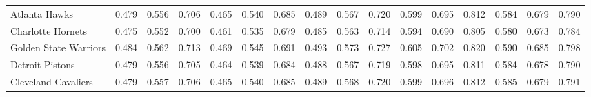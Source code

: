 \documentclass[11pt,a4paper]{article}
\begin{document}
\begin{table}[H]
\begin{tabular}{l ccc ccc ccc ccc ccc}
Atlanta Hawks & 0.479 & 0.556 & 0.706 & 0.465 & 0.540 & 0.685 & 0.489 & 0.567 & 0.720 & 0.599 & 0.695 & 0.812 & 0.584 & 0.679 & 0.790 \\
Charlotte Hornets & 0.475 & 0.552 & 0.700 & 0.461 & 0.535 & 0.679 & 0.485 & 0.563 & 0.714 & 0.594 & 0.690 & 0.805 & 0.580 & 0.673 & 0.784 \\
Golden State Warriors & 0.484 & 0.562 & 0.713 & 0.469 & 0.545 & 0.691 & 0.493 & 0.573 & 0.727 & 0.605 & 0.702 & 0.820 & 0.590 & 0.685 & 0.798 \\
Detroit Pistons & 0.479 & 0.556 & 0.705 & 0.464 & 0.539 & 0.684 & 0.488 & 0.567 & 0.719 & 0.598 & 0.695 & 0.811 & 0.584 & 0.678 & 0.790 \\
Cleveland Cavaliers & 0.479 & 0.557 & 0.706 & 0.465 & 0.540 & 0.685 & 0.489 & 0.568 & 0.720 & 0.599 & 0.696 & 0.812 & 0.585 & 0.679 & 0.791 \\
\bottomrule
\end{tabular}
\end{table}
\end{document}
